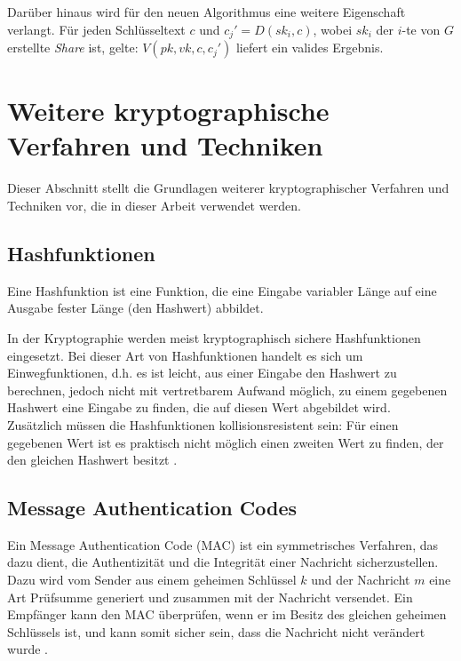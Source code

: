 Darüber hinaus wird für den neuen Algorithmus eine weitere Eigenschaft verlangt. Für jeden Schlüsseltext \(c\) und \(c_j' = D(sk_i,c)\), wobei \(sk_i\) der \(i\)-te von \(G\) erstellte \textit{Share} ist, gelte: \(V(pk, vk, c, c_j')\) liefert ein valides Ergebnis.



\section{Weitere kryptographische Verfahren und Techniken}

Dieser Abschnitt stellt die Grundlagen weiterer kryptographischer Verfahren und Techniken vor, die in dieser Arbeit verwendet werden.


\subsection{Hashfunktionen}

Eine Hashfunktion ist eine Funktion, die eine Eingabe variabler Länge auf eine Ausgabe fester Länge (den Hashwert) abbildet.

In der Kryptographie werden meist kryptographisch sichere Hashfunktionen eingesetzt. Bei dieser Art von Hashfunktionen handelt es sich um Einwegfunktionen, d.h. es ist leicht, aus einer Eingabe den Hashwert zu berechnen, jedoch nicht mit vertretbarem Aufwand möglich, zu einem gegebenen Hashwert eine Eingabe zu finden, die auf diesen Wert abgebildet wird.\\
Zusätzlich müssen die Hashfunktionen kollisionsresistent sein: Für einen gegebenen Wert ist es praktisch nicht möglich einen zweiten Wert zu finden, der den gleichen Hashwert besitzt \cite{Schneier2006}.

\subsection{Message Authentication Codes}

\label{sec_mac}

Ein Message Authentication Code (MAC) ist ein symmetrisches Verfahren, das dazu dient, die Authentizität und die Integrität einer Nachricht sicherzustellen. Dazu wird vom Sender aus einem geheimen Schlüssel \(k\) und der Nachricht \(m\) eine Art Prüfsumme generiert und zusammen mit der Nachricht versendet. Ein Empfänger kann den MAC überprüfen, wenn er im Besitz des gleichen geheimen Schlüssels ist, und kann somit sicher sein, dass die Nachricht nicht verändert wurde \cite{Schneier2006}.

